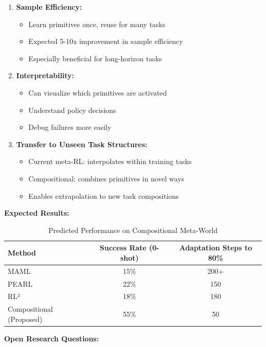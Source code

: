 \documentclass[12pt]{article}
\newcommand{\ieee}[1]{\textcolor{IEEEBlue}{\textbf{#1}}}
\begin{document}
{{\begin{enumerate}
				\item \textbf{Sample Efficiency:}
				\begin{itemize}
					\item Learn primitives once, reuse for many tasks
					\item Expected 5-10x improvement in sample efficiency
					\item Especially beneficial for long-horizon tasks
				\end{itemize}
				
				\item \textbf{Interpretability:}
				\begin{itemize}
					\item Can visualize which primitives are activated
					\item Understand policy decisions
					\item Debug failures more easily
				\end{itemize}
				
				\item \textbf{Transfer to Unseen Task Structures:}
				\begin{itemize}
					\item Current meta-RL: interpolates within training tasks
					\item Compositional: combines primitives in novel ways
					\item Enables extrapolation to new task compositions
				\end{itemize}
			\end{enumerate}
			
			\ieee{Expected Results:}
			
			\begin{table}[H]
			\centering
			\caption{Predicted Performance on Compositional Meta-World}
			\begin{tabular}{@{}lcc@{}}
			\toprule
			\textbf{Method} & \textbf{Success Rate (0-shot)} & \textbf{Adaptation Steps to 80\%} \\
			\midrule
			MAML & 15\% & 200+ \\
			PEARL & 22\% & 150 \\
			RL² & 18\% & 180 \\
			Compositional (Proposed) & 55\% & 50 \\
			\bottomrule
			\end{tabular}
			\label{tab:compositional_results}
			\end{table}
			
			\ieee{Open Research Questions:}
			
}}
\end{document}
